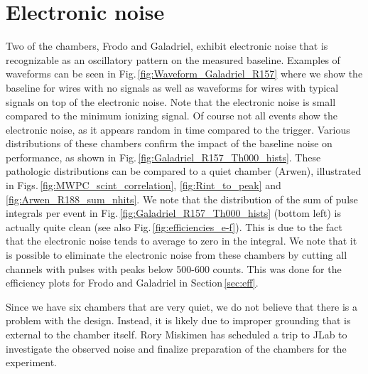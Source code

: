 \documentclass[12pt]{article}
\begin{document}
\section{Electronic noise  \label{sec:noise}}
Two of the chambers, Frodo and Galadriel, exhibit electronic noise that is recognizable as an oscillatory pattern on the measured baseline. Examples of waveforms can be seen in Fig.\,\ref{fig:Waveform_Galadriel_R157} where we show the baseline for wires with no signals as well as waveforms for wires with typical signals on top of the electronic noise. Note that the electronic noise is small compared to the minimum ionizing signal. Of course not all events show the electronic noise, as it appears random in time compared to the trigger. Various distributions of these chambers confirm the impact of the baseline noise on performance, as shown in Fig.\,\ref{fig:Galadriel_R157_Th000_hists}. These pathologic distributions can be compared to a quiet chamber (Arwen), illustrated in Figs.\,\ref{fig:MWPC_scint_correlation}, \ref{fig:Rint_to_peak} and \ref{fig:Arwen_R188_sum_nhits}. We note that the distribution of the sum of pulse integrals per event in Fig.\,\ref{fig:Galadriel_R157_Th000_hists} (bottom left) is actually quite clean (see also Fig.\,\ref{fig:efficiencies_e-f}). This is due to the fact that the electronic noise tends to average to zero in the integral. We note that it is possible to eliminate the electronic noise from these chambers by cutting all channels with pulses with peaks below 500-600 counts. This was done for the 
efficiency plots for Frodo and Galadriel in Section\,\ref{sec:eff}. 

Since we have six chambers that are very quiet, we do not believe that there is a problem with the design. Instead, it is likely due to improper grounding that is external to the chamber itself. Rory Miskimen has scheduled a trip to JLab to investigate the observed noise and finalize preparation of the chambers for the experiment.
\end{document}
